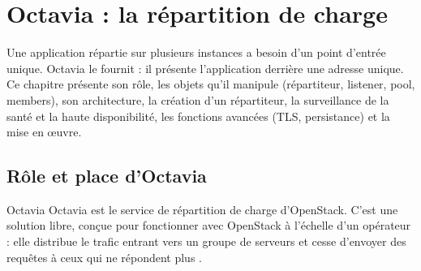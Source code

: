 
\section{Octavia : la répartition de charge}\label{chap:octavia}

Une application répartie sur plusieurs instances a besoin d'un point d'entrée unique. Octavia le fournit : il présente
l'application derrière une adresse unique. Ce chapitre présente son rôle, les objets qu'il manipule (répartiteur, listener,
pool, members), son architecture, la création d'un répartiteur, la surveillance de la santé et la haute disponibilité, les
fonctions avancées (TLS, persistance) et la mise en œuvre.

\subsection{Rôle et place d'Octavia}\label{sec:oc-role}

\begin{definition}{Octavia}
Octavia est le service de répartition de charge d'OpenStack. C'est une solution libre, conçue pour fonctionner avec
OpenStack à l'échelle d'un opérateur : elle distribue le trafic entrant vers un groupe de serveurs et cesse d'envoyer des
requêtes à ceux qui ne répondent plus \parencite{octavia-intro}.
\end{definition}

